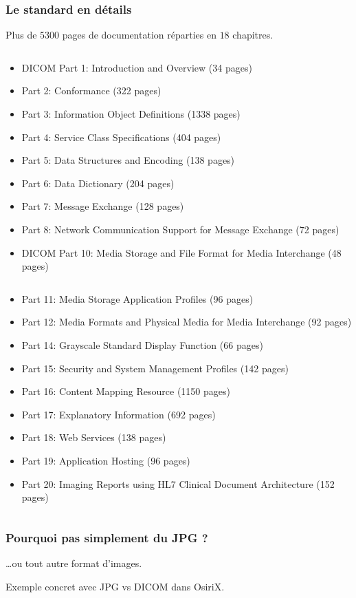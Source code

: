 	\frame
	{
		\frametitle{Le standard en d\'etails}
		Plus de $5300$ pages de documentation r\'eparties en $18$ chapitres.
		
		\begin{columns}\begin{scriptsize}
	  	\begin{column}[t]{0.5\linewidth}
			\begin{itemize}
				\item DICOM Part 1: Introduction and Overview (34 pages)
				\item Part 2: Conformance (322 pages)
				\item Part 3: Information Object Definitions (1338 pages)
				\item Part 4: Service Class Specifications (404 pages)
				\item Part 5: Data Structures and Encoding (138 pages)
				\item Part 6: Data Dictionary (204 pages)
				\item Part 7: Message Exchange (128 pages)
				\item Part 8: Network Communication Support for Message Exchange (72 pages)
				\item DICOM Part 10: Media Storage and File Format for Media Interchange (48 pages)
			\end{itemize}
	  	\end{column}
	  	\begin{column}[t]{0.5\linewidth}
			\begin{itemize}
				\item Part 11: Media Storage Application Profiles (96 pages)
				\item Part 12: Media Formats and Physical Media for Media Interchange (92 pages)
				\item Part 14: Grayscale Standard Display Function (66 pages)
				\item Part 15: Security and System Management Profiles (142 pages)
				\item Part 16: Content Mapping Resource (1150 pages)
				\item Part 17: Explanatory Information (692 pages)
				\item Part 18: Web Services (138 pages)
				\item Part 19: Application Hosting (96 pages)
				\item Part 20: Imaging Reports using HL7 Clinical Document Architecture (152 pages)
			\end{itemize}
	  	\end{column}\end{scriptsize}
	  	\end{columns}
	}

	\frame
	{
		\frametitle{Pourquoi pas simplement du JPG ?}
		\ldots ou tout autre format d'images.

		Exemple concret avec JPG vs DICOM dans OsiriX.
	}

